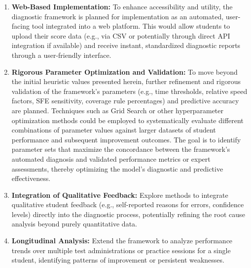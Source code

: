 \documentclass{article}
\begin{document}
\begin{enumerate}
    \item \textbf{Web-Based Implementation:} To enhance accessibility and utility, the diagnostic framework is planned for implementation as an automated, user-facing tool integrated into a web platform. This would allow students to upload their score data (e.g., via CSV or potentially through direct API integration if available) and receive instant, standardized diagnostic reports through a user-friendly interface.
    \item \textbf{Rigorous Parameter Optimization and Validation:} To move beyond the initial heuristic values presented herein, further refinement and rigorous validation of the framework's parameters (e.g., time thresholds, relative speed factors, SFE sensitivity, coverage rule percentages) and predictive accuracy are planned. Techniques such as Grid Search or other hyperparameter optimization methods could be employed to systematically evaluate different combinations of parameter values against larger datasets of student performance and subsequent improvement outcomes. The goal is to identify parameter sets that maximize the concordance between the framework's automated diagnosis and validated performance metrics or expert assessments, thereby optimizing the model's diagnostic and predictive effectiveness.
    \item \textbf{Integration of Qualitative Feedback:} Explore methods to integrate qualitative student feedback (e.g., self-reported reasons for errors, confidence levels) directly into the diagnostic process, potentially refining the root cause analysis beyond purely quantitative data.
    \item \textbf{Longitudinal Analysis:} Extend the framework to analyze performance trends over multiple test administrations or practice sessions for a single student, identifying patterns of improvement or persistent weaknesses.
\end{enumerate}

\end{document}
